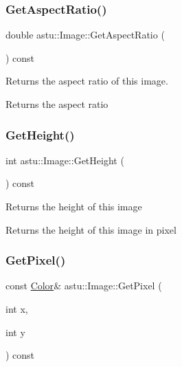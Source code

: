 \subsubsection{\texorpdfstring{Get\+Aspect\+Ratio()}{GetAspectRatio()}}
{\footnotesize\ttfamily double astu\+::\+Image\+::\+Get\+Aspect\+Ratio (\begin{DoxyParamCaption}{ }\end{DoxyParamCaption}) const\hspace{0.3cm}{\ttfamily [inline]}}

Returns the aspect ratio of this image.

\begin{DoxyReturn}{Returns}
the aspect ratio 
\end{DoxyReturn}
\mbox{\label{classastu_1_1Image_ad64d3b2abc18e54ba8beb4e212a75a10}} 
\subsubsection{\texorpdfstring{Get\+Height()}{GetHeight()}}
{\footnotesize\ttfamily int astu\+::\+Image\+::\+Get\+Height (\begin{DoxyParamCaption}{ }\end{DoxyParamCaption}) const\hspace{0.3cm}{\ttfamily [inline]}}

Returns the height of this image

\begin{DoxyReturn}{Returns}
the height of this image in pixel 
\end{DoxyReturn}
\mbox{\label{classastu_1_1Image_a8a31850315f2c74bc90627f4a292a10d}} 
\subsubsection{\texorpdfstring{Get\+Pixel()}{GetPixel()}\hspace{0.1cm}{\footnotesize\ttfamily [1/2]}}
{\footnotesize\ttfamily const \hyperlink{classastu_1_1Color}{Color}\& astu\+::\+Image\+::\+Get\+Pixel (\begin{DoxyParamCaption}\item[{int}]{x,  }\item[{int}]{y }\end{DoxyParamCaption}) const}

